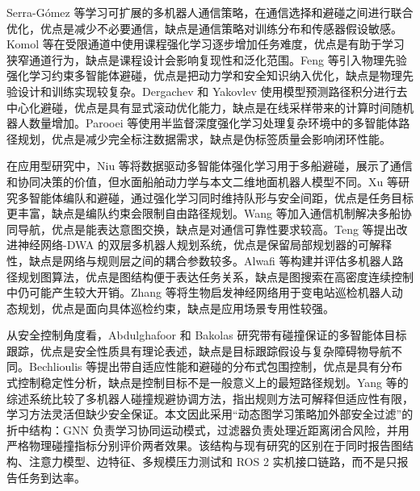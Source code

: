 \documentclass[UTF8,a4paper,11pt]{ctexart}
\begin{document}
Serra-Gómez 等学习可扩展的多机器人通信策略，在通信选择和避碰之间进行联合优化，优点是减少不必要通信，缺点是通信策略对训练分布和传感器假设敏感\cite{serragomez2023communication}。Komol 等在受限通道中使用课程强化学习逐步增加任务难度，优点是有助于学习狭窄通道行为，缺点是课程设计会影响复现性和泛化范围\cite{komol2025curriculum}。Feng 等引入物理先验强化学习约束多智能体避碰，优点是把动力学和安全知识纳入优化，缺点是物理先验设计和训练实现较复杂\cite{feng2024physics}。Dergachev 和 Yakovlev 使用模型预测路径积分进行去中心化避碰，优点是具有显式滚动优化能力，缺点是在线采样带来的计算时间随机器人数量增加\cite{dergachev2024mppi}。Parooei 等使用半监督深度强化学习处理复杂环境中的多智能体路径规划，优点是减少完全标注数据需求，缺点是伪标签质量会影响闭环性能\cite{parooei2023semisupervised}。

在应用型研究中，Niu 等将数据驱动多智能体强化学习用于多船避碰，展示了通信和协同决策的价值，但水面船舶动力学与本文二维地面机器人模型不同\cite{niu2023ship}。Xu 等研究多智能体编队和避碰，通过强化学习同时维持队形与安全间距，优点是任务目标更丰富，缺点是编队约束会限制自由路径规划\cite{xu2024formation}。Wang 等加入通信机制解决多船协同导航，优点是能表达意图交换，缺点是对通信可靠性要求较高\cite{wang2025ships}。Teng 等提出改进神经网络-DWA 的双层多机器人规划系统，优点是保留局部规划器的可解释性，缺点是网络与规则层之间的耦合参数较多\cite{teng2025dual}。Alwafi 等构建并评估多机器人路径规划图算法，优点是图结构便于表达任务关系，缺点是图搜索在高密度连续控制中仍可能产生较大开销\cite{alwafi2025graph}。Zhang 等将生物启发神经网络用于变电站巡检机器人动态规划，优点是面向具体巡检约束，缺点是应用场景专用性较强\cite{zhang2024glasius}。

从安全控制角度看，Abdulghafoor 和 Bakolas 研究带有碰撞保证的多智能体目标跟踪，优点是安全性质具有理论表述，缺点是目标跟踪假设与复杂障碍物导航不同\cite{abdulghafoor2023tracking}。Bechlioulis 等提出带自适应性能和避碰的分布式包围控制，优点是具有分布式控制稳定性分析，缺点是控制目标不是一般意义上的最短路径规划\cite{bechlioulis2024containment}。Yang 等的综述系统比较了多机器人碰撞规避协调方法，指出规则方法可解释但适应性有限，学习方法灵活但缺少安全保证\cite{yang2025survey}。本文因此采用“动态图学习策略加外部安全过滤”的折中结构：GNN 负责学习协同运动模式，过滤器负责处理近距离闭合风险，并用严格物理碰撞指标分别评价两者效果。该结构与现有研究的区别在于同时报告图结构、注意力模型、边特征、多规模压力测试和 ROS 2 实机接口链路，而不是只报告任务到达率。
\end{document}
